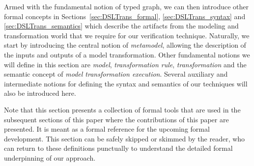 

Armed with the fundamental notion of typed graph, we can then introduce other formal concepts in Sections~\ref{sec:DSLTrans_formal}, \ref{sec:DSLTrans_syntax} and \ref{sec:DSLTrans_semantics} which describe the artifacts from the modeling and transformation world that we require for our verification technique. Naturally, we start by introducing the central notion of \emph{metamodel}, allowing the description of the inputs and outputs of a model transformation. Other fundamental notions we will define in this section are \emph{model}, \emph{transformation rule}, \emph{transformation} and the semantic concept of \emph{model transformation execution}. Several auxiliary and intermediate notions for defining the syntax and semantics of our techniques will also be introduced here. 

Note that this section presents a collection of formal tools that are used in the subsequent sections of this paper where the contributions of this paper are presented. It is meant as a formal reference for the upcoming formal development. This section can be safely skipped or skimmed by the reader, who can return to these definitions punctually to understand the detailed formal underpinning of our approach. 

    
